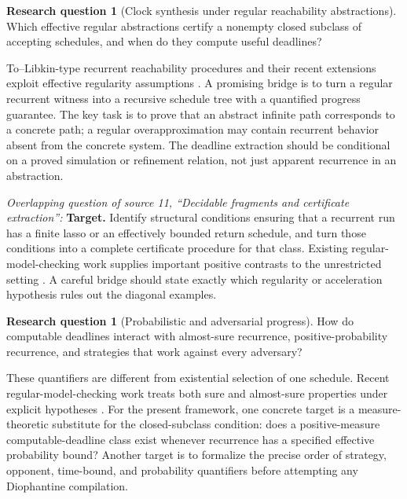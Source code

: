 \documentclass[11pt,letterpaper]{article}
\theoremstyle{definition}
\newtheorem{question}[theorem]{Research question}
\theoremstyle{remark}
\newcommand{\1}{\mathbf 1}
\begin{document}
\begin{question}[Clock synthesis under regular reachability abstractions]
Which effective regular abstractions certify a nonempty closed subclass
of accepting schedules, and when do they compute useful deadlines?
\end{question}
To--Libkin-type recurrent reachability procedures and their recent
extensions exploit effective regularity assumptions \cite{ek2025}.
A promising bridge is to turn a regular recurrent witness into a recursive
schedule tree with a quantified progress guarantee. The key task is to
prove that an abstract infinite path corresponds to a concrete path;
a regular overapproximation may contain recurrent behavior absent from
the concrete system. The deadline extraction should be conditional on a
proved simulation or refinement relation, not just apparent recurrence in
an abstraction.

\par\smallskip\noindent\textit{Overlapping question of source 11, ``Decidable fragments and certificate extraction'':} \textbf{Target.} Identify structural conditions ensuring that a recurrent run
has a finite lasso or an effectively bounded return schedule, and turn those
conditions into a complete certificate procedure for that class. Existing
regular-model-checking work supplies important positive contrasts to the
unrestricted setting \cite{to-libkin}. A careful bridge should state exactly
which regularity or acceleration hypothesis rules out the diagonal examples.

\begin{question}[Probabilistic and adversarial progress]
How do computable deadlines interact with almost-sure recurrence,
positive-probability recurrence, and strategies that work against every
adversary?
\end{question}
These quantifiers are different from existential selection of one schedule.
Recent regular-model-checking work treats both sure and almost-sure
properties under explicit hypotheses \cite{ek2025}. For the present
framework, one concrete target is a measure-theoretic substitute for the
closed-subclass condition: does a positive-measure computable-deadline
class exist whenever recurrence has a specified effective probability
bound? Another target is to formalize the precise order of strategy,
opponent, time-bound, and probability quantifiers before attempting any
Diophantine compilation.
\end{document}
